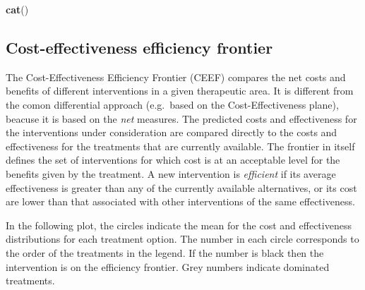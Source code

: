 \documentclass[]{article}
\newenvironment{Shaded}{\begin{snugshade}}{\end{snugshade}}
\newcommand{\ControlFlowTok}[1]{\textcolor[rgb]{0.13,0.29,0.53}{\textbf{#1}}}
\newcommand{\DataTypeTok}[1]{\textcolor[rgb]{0.13,0.29,0.53}{#1}}
\newcommand{\DecValTok}[1]{\textcolor[rgb]{0.00,0.00,0.81}{#1}}
\newcommand{\KeywordTok}[1]{\textcolor[rgb]{0.13,0.29,0.53}{\textbf{#1}}}
\newcommand{\NormalTok}[1]{#1}
\newcommand{\OperatorTok}[1]{\textcolor[rgb]{0.81,0.36,0.00}{\textbf{#1}}}
\newcommand{\OtherTok}[1]{\textcolor[rgb]{0.56,0.35,0.01}{#1}}
\newcommand{\StringTok}[1]{\textcolor[rgb]{0.31,0.60,0.02}{#1}}
\begin{document}
\begin{Shaded}
\begin{Highlighting}[]
\KeywordTok{cat}\NormalTok{()}
\end{Highlighting}
\end{Shaded}

\hypertarget{cost-effectiveness-efficiency-frontier}{%
\subsection{Cost-effectiveness efficiency
frontier}\label{cost-effectiveness-efficiency-frontier}}

The Cost-Effectiveness Efficiency Frontier (CEEF) compares the net costs
and benefits of different interventions in a given therapeutic area. It
is different from the comon differential approach (e.g.~based on the
Cost-Effectiveness plane), beacuse it is based on the \emph{net}
measures. The predicted costs and effectiveness for the interventions
under consideration are compared directly to the costs and effectiveness
for the treatments that are currently available. The frontier in itself
defines the set of interventions for which cost is at an acceptable
level for the benefits given by the treatment. A new intervention is
\emph{efficient} if its average effectiveness is greater than any of the
currently available alternatives, or its cost are lower than that
associated with other interventions of the same effectiveness.

In the following plot, the circles indicate the mean for the cost and
effectiveness distributions for each treatment option. The number in
each circle corresponds to the order of the treatments in the legend. If
the number is black then the intervention is on the efficiency frontier.
Grey numbers indicate dominated treatments.

\begin{Shaded}
\end{Shaded}
\end{document}
